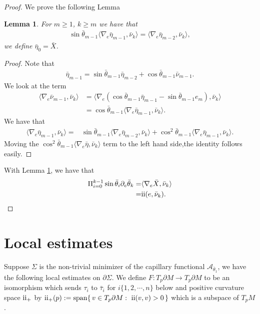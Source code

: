 \documentclass[11pt,letterpaper]{amsart}
\newcommand{\RN}[1]{%
  \textup{\uppercase\expandafter{\romannumeral#1}}%
}
\newtheorem{lem}{Lemma}[section]
\begin{document}
\begin{proof}
    We prove the following Lemma
    \begin{lem}\label{lem: angle induction}
        For $m\geq 1$, $k\geq m$ we have that
        \begin{align}
            \sin\bar{\theta}_{m-1}\langle \nabla_e\bar{\eta}_{m-1},\bar{\nu}_k\rangle =\langle \nabla_{e}\bar{\eta}_{m-2},\bar{\nu}_k\rangle,
        \end{align}
        we define $\bar{\eta}_0=\bar{X}$.
    \end{lem}
    \begin{proof}
        Note that 
        \begin{align}
            \bar{\eta}_{m-1}=\sin\bar{\theta}_{m-1}\bar{\eta}_{m-2}+\cos\bar{\theta}_{m-1}\bar{\nu}_{m-1}.
        \end{align}
        We look at the term
        \begin{align}
            \langle \nabla_e\bar{\nu}_{m-1},\bar{\nu}_k\rangle&=\langle \nabla_e\left(\cos\bar{\theta}_{m-1}\bar{\eta}_{m-1}-\sin\bar{\theta}_{m-1}e_m\right),\bar{\nu}_k\rangle\\
           \nonumber &=\cos\bar{\theta}_{m-1}\langle \nabla_e\bar{\eta}_{m-1},\bar{\nu}_k\rangle.
        \end{align}
        We have that
        \begin{align*}
            \langle \nabla_e\bar{\eta}_{m-1},\bar{\nu}_k\rangle=&\sin\bar{\theta}_{m-1}\langle \nabla_e\bar{\eta}_{m-2},\bar{\nu}_k\rangle+\cos^2\bar{\theta}_{m-1}\langle \nabla_{e}\bar{\eta}_{m-1},\bar{\nu}_k\rangle.
        \end{align*}
        Moving the $\cos^2\bar{\theta}_{m-1}\langle \nabla_e\bar{\eta},\bar{\nu}_k\rangle$ term to the left hand side,the identity follows easily.
    \end{proof}
    With Lemma \ref{lem: angle induction}, we have that
    \begin{align*}
        \Pi_{i=0}^{k-1}\sin\bar{\theta}_i\partial_e\bar{\theta}_k=&\langle \nabla_e\bar{X},\bar{\nu}_k\rangle\\
        =&\RN{2}(e,\bar{\nu}_k).
    \end{align*}
\end{proof}


\section{Local estimates} \label{section: local estimates}

Suppose $\Sigma$ is the non-trivial minimizer of the capillary functional $\mathcal {A}_{\bar{\theta}_1}$, we have the following local estimates on $\partial\Sigma$. We define $F: T_{p}\partial M \rightarrow T_{p}\partial M$ to be an isomorphism which sends $\tau_{i}$ to $\bar{\tau}_{i}$ for $i\{1,2,\cdots,n\}$ below and positive curvature space $\RN{2}_{+}$ by $\RN{2}_{+}(p):=\operatorname{span}\{\,v\in T_p\partial M:\ \RN{2}(v,v)>0\,\}$ which is a subspace of $T_{p}M$.
\end{document}
